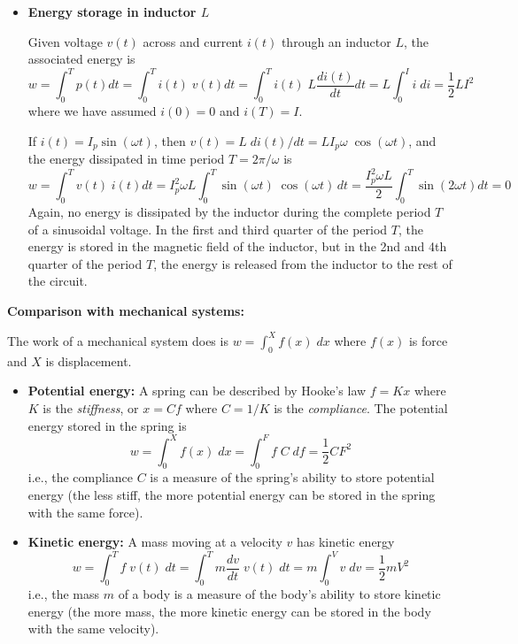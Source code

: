 \begin{itemize}
\begin{itemize}

\item {\bf Energy storage in inductor $L$}

  Given voltage $v(t)$ across and current $i(t)$ through an inductor $L$,
  the associated energy is
  \[	
  w=\int_0^T p(t)dt=\int_0^T i(t)\; v(t) dt
  =\int_0^T i(t) \;L \frac{di(t)}{dt} dt
  =L \int_0^I i\;di=\frac{1}{2}LI^2
  \]
  where we have assumed $i(0)=0$ and $i(T)=I$. 

  If $i(t)=I_p \sin(\omega t)$, then
  $v(t)= L\;di(t)/dt=L I_p\omega\;\cos(\omega t)$, and the energy dissipated
  in time period $T=2\pi/\omega$ is
  \[
  w=\int_0^T v(t)\;i(t) dt=I_p^2\omega L\int_0^T \sin(\omega t)\;\cos(\omega t)\,dt
  =\frac{I_p^2\omega L}{2} \int_0^T \sin(2\omega t) dt=0 
  \]
  Again, no energy is dissipated by the inductor during the complete period
  $T$ of a sinusoidal voltage. In the first and third quarter of the period 
  $T$, the energy is stored in the magnetic field of the inductor, but in 
  the 2nd and 4th quarter of the period $T$, the energy is released from the 
  inductor to the rest of the circuit.


\end{itemize}

{\bf Comparison with mechanical systems:}

The work of a mechanical system does is $w=\int_0^X f(x)\; dx$ where $f(x)$ 
is force and $X$ is displacement.
\begin{itemize}		
\item {\bf Potential energy:} A spring can be described by Hooke's law $f=Kx$
  where $K$ is the {\em stiffness}, or $x=Cf$ where $C=1/K$ is the 
  {\em compliance}. The potential energy stored in the spring is
  \[
  w=\int_0^X f(x)\;dx=\int_0^F f\;C\;df=\frac{1}{2}CF^2	
  \]	
  i.e., the compliance $C$ is a measure of the spring's ability to 
  store potential energy (the less stiff, the more potential energy can
  be stored in the spring with the same force).
\item {\bf Kinetic energy:} A mass moving at a velocity $v$ has kinetic
  energy
  \[
  w=\int_0^T f\;v(t)\;dt=\int_0^T m \frac{dv}{dt}\;v(t)\;dt
  =m \int_0^V v\;dv=\frac{1}{2}mV^2 
  \]
  i.e., the mass $m$ of a body is a measure of the body's ability to 
  store kinetic energy (the more mass, the more kinetic energy can be 
  stored in the body with the same velocity).
\end{itemize}		


\end{itemize}
